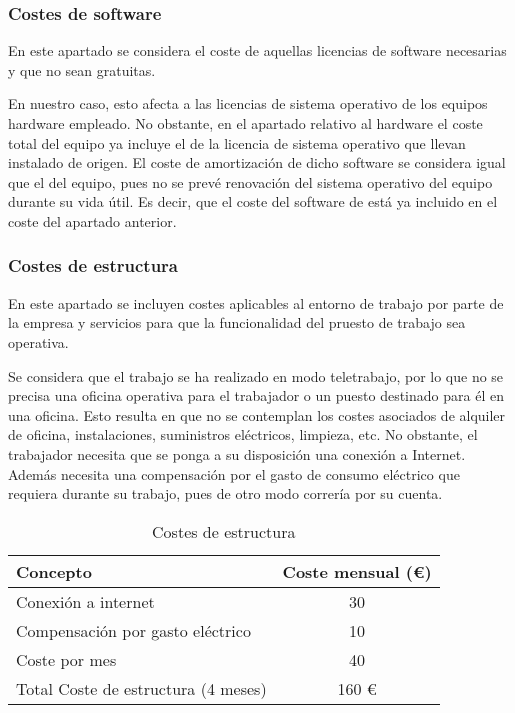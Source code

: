 \subsubsection{Costes de software}
En este apartado se considera el coste de aquellas licencias de software necesarias y que no sean gratuitas.

En nuestro caso, esto afecta a las licencias de sistema operativo de los equipos hardware
empleado. No obstante, en el apartado relativo al hardware el coste total del equipo ya incluye el de la licencia de sistema operativo que llevan instalado de origen. El coste de amortización de dicho software se considera igual que el del equipo, pues no se prevé renovación del sistema operativo del equipo durante su vida útil. Es decir, que el coste del software de está ya incluido en el coste del apartado anterior.

\subsubsection{Costes de estructura}
En este apartado se incluyen costes aplicables al entorno de trabajo por parte de la empresa y servicios para que la funcionalidad del pruesto de trabajo sea operativa.

Se considera que el trabajo se ha realizado en modo teletrabajo, por lo que no se precisa una oficina operativa para el trabajador o un puesto destinado para él en una oficina. Esto resulta en que no se contemplan los costes asociados de alquiler de oficina, instalaciones, suministros eléctricos, limpieza, etc. No obstante, el trabajador necesita que se ponga a su disposición una conexión a Internet. Además necesita una compensación por el gasto de consumo eléctrico que requiera durante su trabajo, pues de otro modo correría por su cuenta.

\begin{table}[H]
\begin{center}
\begin{tabular}{| l | c |} \hline
\textbf{Concepto}   & \textbf{Coste mensual (€)}  \\ \hline
Conexión a internet & 30\\
Compensación por gasto eléctrico & 10\\
Coste por mes & 40 \\ \hline
Total Coste de estructura (4 meses)  & 160 €\\ \hline
\end{tabular}
\caption{Costes de estructura}
\end{center}
\end{table}

